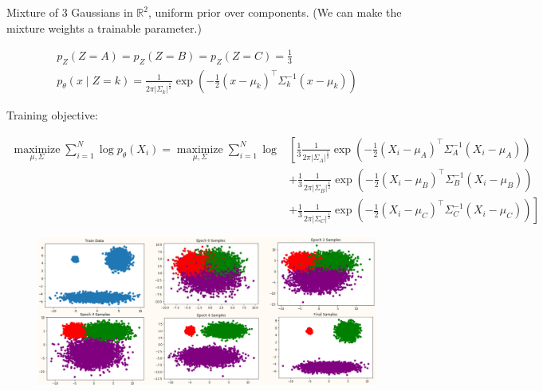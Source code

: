 \begin{example}
    Mixture of 3 Gaussians in $\mathbb{R}^{2}$, uniform prior over components. (We can make the mixture weights a trainable parameter.)

    $$
    \begin{gathered}
    p_{Z}(Z=A)=p_{Z}(Z=B)=p_{Z}(Z=C)=\frac{1}{3} \\
    p_{\theta}(x \mid Z=k)=\frac{1}{2 \pi\left|\Sigma_{k}\right|^{\frac{1}{2}}} \exp \left(-\frac{1}{2}\left(x-\mu_{k}\right)^{\top} \Sigma_{k}^{-1}\left(x-\mu_{k}\right)\right)
    \end{gathered}
    $$

    Training objective:

    $$
    \begin{aligned}
    \underset{\mu, \Sigma}{\operatorname{maximize}} \sum_{i=1}^{N} \log p_{\theta}\left(X_{i}\right)=\underset{\mu, \Sigma}{\operatorname{maximize}} \sum_{i=1}^{N} \log & \left[ \frac{1}{3} \frac{1}{2 \pi\left|\Sigma_{A}\right|^{\frac{1}{2}}} \exp \left(-\frac{1}{2}\left(X_{i}-\mu_{A}\right)^{\top} \Sigma_{A}^{-1}\left(X_{i}-\mu_{A}\right)\right) \right.\\
    & +\frac{1}{3} \frac{1}{2 \pi\left|\Sigma_{B}\right|^{\frac{1}{2}}} \exp \left(-\frac{1}{2}\left(X_{i}-\mu_{B}\right)^{\top} \Sigma_{B}^{-1}\left(X_{i}-\mu_{B}\right)\right) \\
    & \left.+\frac{1}{3} \frac{1}{2 \pi\left|\Sigma_{C}\right|^{\frac{1}{2}}} \exp \left(-\frac{1}{2}\left(X_{i}-\mu_{C}\right)^{\top} \Sigma_{C}^{-1}\left(X_{i}-\mu_{C}\right)\right)\right]
    \end{aligned}
    $$

    \begin{figure}[H]
        \centering
        \includegraphics[width=1.0\textwidth]{.././assets/11.3.png}
    \end{figure}
\end{example}


